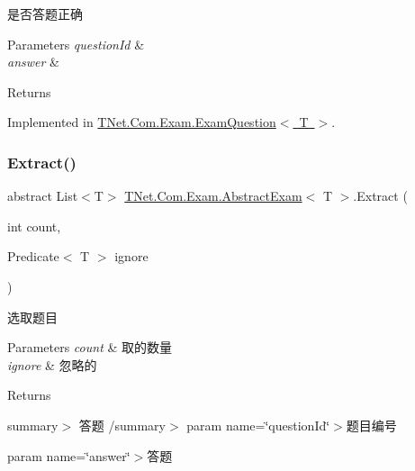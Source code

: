 是否答题正确 


\begin{DoxyParams}{Parameters}
{\em question\+Id} & \\
\hline
{\em answer} & \\
\hline
\end{DoxyParams}
\begin{DoxyReturn}{Returns}

\end{DoxyReturn}


Implemented in \mbox{\hyperlink{class_t_net_1_1_com_1_1_exam_1_1_exam_question_acda26f165e3790cb094ee63d4c1d9cf5}{T\+Net.\+Com.\+Exam.\+Exam\+Question$<$ T $>$}}.

\mbox{\label{class_t_net_1_1_com_1_1_exam_1_1_abstract_exam_a5c9f0c8798f5666caf68476f53d6d039}} 
\subsubsection{\texorpdfstring{Extract()}{Extract()}}
{\footnotesize\ttfamily abstract List$<$T$>$ \mbox{\hyperlink{class_t_net_1_1_com_1_1_exam_1_1_abstract_exam}{T\+Net.\+Com.\+Exam.\+Abstract\+Exam}}$<$ T $>$.Extract (\begin{DoxyParamCaption}\item[{int}]{count,  }\item[{Predicate$<$ T $>$}]{ignore }\end{DoxyParamCaption})\hspace{0.3cm}{\ttfamily [pure virtual]}}



选取题目 


\begin{DoxyParams}{Parameters}
{\em count} & 取的数量\\
\hline
{\em ignore} & 忽略的\\
\hline
\end{DoxyParams}
\begin{DoxyReturn}{Returns}

\end{DoxyReturn}
summary$>$ 答题 /summary$>$ param name=\char`\"{}question\+Id\char`\"{}$>$题目编号

param name=\char`\"{}answer\char`\"{}$>$答题

